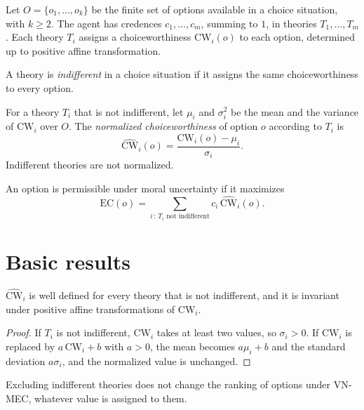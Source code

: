 \documentclass{situationist-preprint}
\begin{document}
Let $O = \{o_1, \dots, o_k\}$ be the finite set of options available in a choice situation, with $k \geq 2$. The agent has credences $c_1, \dots, c_m$, summing to $1$, in theories $T_1, \dots, T_m$. Each theory $T_i$ assigns a choiceworthiness $\mathrm{CW}_i(o)$ to each option, determined up to positive affine transformation.

\begin{definition}\label{d:indiff}
A theory is \emph{indifferent} in a choice situation if it assigns the same choiceworthiness to every option.
\end{definition}

\begin{definition}\label{d:vn}
For a theory $T_i$ that is not indifferent, let $\mu_i$ and $\sigma_i^2$ be the mean and the variance of $\mathrm{CW}_i$ over $O$. The \emph{normalized choiceworthiness} of option $o$ according to $T_i$ is
\[
\widehat{\mathrm{CW}}_i(o) = \frac{\mathrm{CW}_i(o) - \mu_i}{\sigma_i}.
\]
Indifferent theories are not normalized.
\end{definition}

\begin{definition}[VN-MEC]\label{d:vnmec}
An option is permissible under moral uncertainty if it maximizes
\[
\mathrm{EC}(o) = \sum_{i \,:\, T_i \text{ not indifferent}} c_i \, \widehat{\mathrm{CW}}_i(o).
\]
\end{definition}

\section{Basic results}

\begin{proposition}\label{p:welldef}
$\widehat{\mathrm{CW}}_i$ is well defined for every theory that is not indifferent, and it is invariant under positive affine transformations of $\mathrm{CW}_i$.
\end{proposition}

\begin{proof}
If $T_i$ is not indifferent, $\mathrm{CW}_i$ takes at least two values, so $\sigma_i > 0$. If $\mathrm{CW}_i$ is replaced by $a\,\mathrm{CW}_i + b$ with $a > 0$, the mean becomes $a\mu_i + b$ and the standard deviation $a\sigma_i$, and the normalized value is unchanged.
\end{proof}

\begin{proposition}\label{p:indiff}
Excluding indifferent theories does not change the ranking of options under VN-MEC, whatever value is assigned to them.
\end{proposition}
\end{document}
